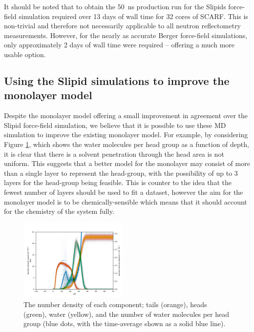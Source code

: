 \documentclass[twoside,twocolumn,9pt]{article}
\begin{document}
It should be noted that to obtain the \SI{50}{\nano\second} production run for the Slipids force-field simulation required over 13 days of wall time for 32 cores of SCARF.
This is non-trivial and therefore not necessarily applicable to all neutron reflectometry measurements.
However, for the nearly as accurate Berger force-field simulations, only approximately 2 days of wall time were required -- offering a much more usable option.

\subsection{Using the Slipid simulations to improve the monolayer model}
Despite the monolayer model offering a small improvement in agreement over the Slipid force-field simulation, we believe that it is possible to use these MD simulation to improve the existing monolayer model.
For example, by considering Figure \ref{fig:nb}, which shows the water molecules per head group as a function of depth, it is clear that there is a solvent penetration through the head area is not uniform.
This suggests that a better model for the monolayer may consist of more than a single layer to represent the head-group, with the possibility of up to 3 layers for the head-group being feasible.
This is counter to the idea that the fewest number of layers should be used to fit a dataset, however the aim for the monolayer model is to be chemically-sensible which means that it should account for the chemistry of the system fully.
%
\begin{figure}[h]
\centering
  \includegraphics[width=0.48\textwidth]{figures/number_density}
  \caption{The number density of each component; tails (orange), heads (green), water (yellow), and the number of water molecules per head group (blue dots, with the time-average shown as a solid blue line).}
  \label{fig:nb}
\end{figure}
%
\end{document}
